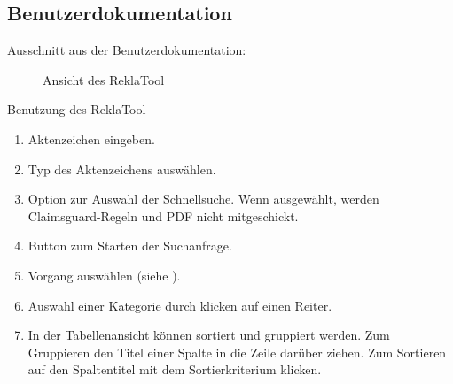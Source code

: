 \subsection{Benutzerdokumentation}
\label{app:BenutzerDoku}
Ausschnitt aus der Benutzerdokumentation:

\begin{figure}[htb]
    \centering
    \caption{Ansicht des ReklaTool}
\end{figure}

Benutzung des ReklaTool
\begin{enumerate}
    \item Aktenzeichen eingeben.
    \item Typ des Aktenzeichens auswählen.
    \item Option zur Auswahl der Schnellsuche. Wenn ausgewählt, werden Claimsguard-Regeln und PDF nicht mitgeschickt.
    \item Button zum Starten der Suchanfrage.
    \item Vorgang auswählen (siehe ).
    \item Auswahl einer Kategorie durch klicken auf einen Reiter.
    \item In der Tabellenansicht können sortiert und gruppiert werden. Zum Gruppieren den Titel einer Spalte in die 
    Zeile darüber ziehen. Zum Sortieren auf den Spaltentitel mit dem Sortierkriterium klicken.
\end{enumerate}